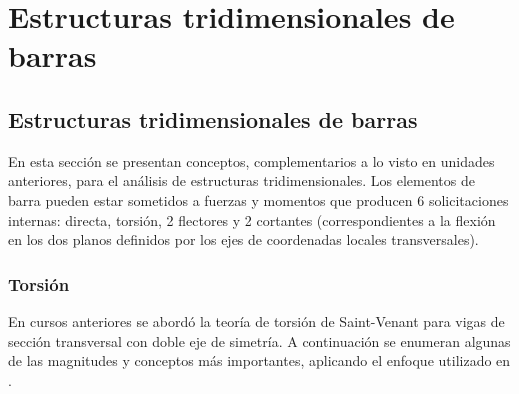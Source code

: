 %
%
%

\chapter{Estructuras tridimensionales de barras}



\section{Estructuras tridimensionales de barras}

En esta sección se presentan conceptos, complementarios a lo visto en unidades anteriores, para el análisis de estructuras tridimensionales. Los elementos de barra pueden estar sometidos a fuerzas y momentos que producen 6 solicitaciones internas: directa, torsión, 2 flectores y 2 cortantes (correspondientes a la flexión en los dos planos definidos por los ejes de coordenadas locales transversales).

\subsection{Torsión}

En cursos anteriores se abordó la teoría de torsión de Saint-Venant para vigas de sección transversal con doble eje de simetría. %
%
A continuación se enumeran algunas de las magnitudes y conceptos más importantes, aplicando el enfoque utilizado en \citep{Wunderlich2002}.

